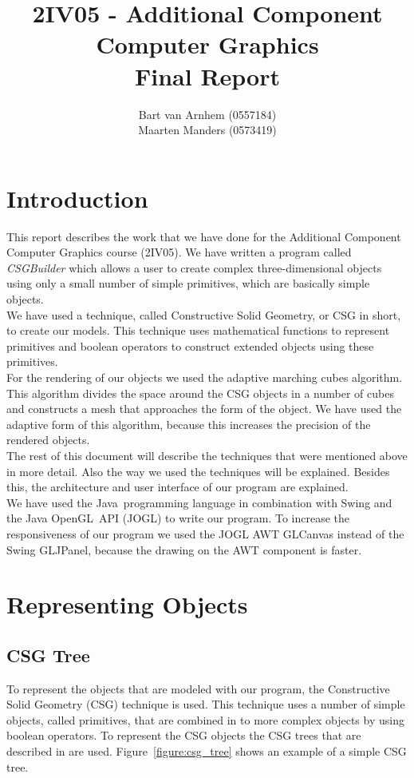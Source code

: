 \documentclass[a4paper,10pt,twoside]{report}
\title{2IV05 - Additional Component Computer Graphics \\ Final Report}
\author{Bart van Arnhem (0557184) \\ Maarten Manders (0573419)}
\begin{document}
\maketitle

\chapter{Introduction}
This report describes the work that we have done for the Additional Component Computer Graphics course (2IV05). We have written a program called \textit{CSGBuilder} which allows a user to create complex three-dimensional objects using only a small number of simple primitives, which are basically simple objects.\\

We have used a technique, called Constructive Solid Geometry, or CSG in short, to create our models. This technique uses mathematical functions to represent primitives and boolean operators to construct extended objects using these primitives.\\

For the rendering of our objects we used the adaptive marching cubes algorithm. This algorithm divides the space around the CSG objects in a number of cubes and constructs a mesh that approaches the form of the object. We have used the adaptive form of this algorithm, because this increases the precision of the rendered objects.\\

The rest of this document will describe the techniques that were mentioned above in more detail. Also the way we used the techniques will be explained. Besides this, the architecture and user interface of our program are explained.\\

We have used the Java\textcopyright\ programming language in combination with Swing and the Java OpenGL\texttrademark\ API (JOGL) to write our program. To increase the responsiveness of our program we used the JOGL AWT GLCanvas instead of the Swing GLJPanel, because the drawing on the AWT component is faster.

\tableofcontents

\chapter{Representing Objects}

\section{CSG Tree}
    To represent the objects that are modeled with our program, the Constructive Solid Geometry (CSG) technique is used. This technique uses a number of simple objects, called primitives, that are combined in to more complex objects by using boolean operators. To represent the CSG objects the CSG trees that are described in \cite{Wiegand96} are used. Figure~\ref{figure:csg_tree} shows an example of a simple CSG tree.\\
\end{document}
